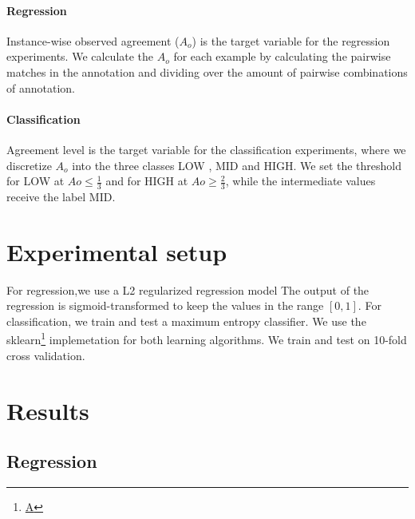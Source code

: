 \documentclass[11pt,a4paper]{article}
\begin{document}
\paragraph*{Regression} Instance-wise observed agreement ($A_o$) is the target variable for the regression experiments. We calculate  the $A_o$ for each example by calculating the pairwise matches in the annotation and dividing over the amount of pairwise combinations of annotation.
\paragraph*{Classification} Agreement level is the target variable for the classification experiments, where we discretize $A_o$ into the three classes LOW , MID and HIGH. We set the threshold for LOW at $Ao \le \frac{1}{3}$ and for HIGH at $Ao \ge \frac{2}{3}$, while the intermediate values receive the label MID.


\section{Experimental setup}
For regression,we use a L2 regularized regression model
The output of the regression is sigmoid-transformed to keep the values in the range $[0,1]$.
For classification, we train and test a maximum entropy classifier. We use the sklearn\footnote{\url{A}} implemetation for both learning algorithms. We train and test  on 10-fold cross validation.


\section{Results}
\subsection{Regression}
\end{document}
